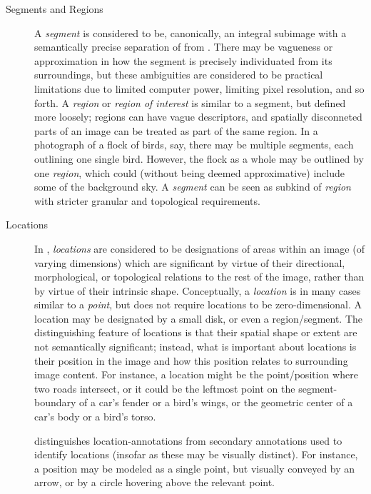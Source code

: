 {\begin{description}
\item[Segments and Regions]  A \textit{segment} is 
considered to be, canonically, an integral 
subimage with a semantically precise 
separation of  from .  
There may be vagueness or approximation 
in how the segment is precisely individuated 
from its surroundings, but these ambiguities 
are considered to be practical limitations 
due to limited computer power, limiting pixel 
resolution, and so forth.  A \textit{region} 
or \textit{region of interest} is similar to a 
segment, but defined more loosely; regions 
can have vague descriptors, and spatially 
disconneted parts of an image can be treated 
as part of the same region.  In a photograph 
of a flock of birds, say, there may be 
multiple segments, each outlining one single bird.  
However, the flock as a whole may be outlined 
by one \textit{region}, which could (without 
being deemed approximative) include some of the 
background sky.  A \textit{segment} can be seen 
as subkind of \textit{region} with stricter 
granular and topological requirements. 

\item[Locations]  In \AXFI{}, \textit{locations} 
are considered to be designations of areas 
within an image (of varying dimensions) which 
are significant by virtue of their directional, 
morphological, or topological relations to 
the rest of the image, rather than by virtue 
of their intrinsic shape.  Conceptually, 
a \textit{location} is in many cases similar 
to a \textit{point}, but \AXFI{} does not require 
locations to be zero-dimensional.  A location 
may be designated by a small disk, or even a
region/segment.  The distinguishing feature 
of locations is that their spatial shape or extent 
are not semantically significant; instead, 
what is important about locations is their 
position in the image and how this position 
relates to surrounding image content.  For 
instance, a location might be the point/position 
where two roads intersect, or it could 
be the leftmost point on the segment-boundary of 
a car's fender or a bird's wings, or the 
geometric center of a car's body or a bird's torso.

\lAXFI{} distinguishes location-annotations from 
secondary annotations used to identify locations 
(insofar as these may be visually distinct).  For 
instance, a position may be modeled as a single 
point, but visually conveyed by an arrow, or by 
a circle hovering above the relevant point.


\end{description}}
